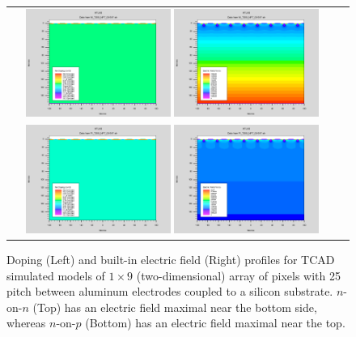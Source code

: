 \begin{figure}[htb]
  \begin{center}
    \begin{tabular}{cc}
      \includegraphics[width=0.45\textwidth]{fig_FastTiming/Net_Doping_nonn.png}
      \includegraphics[width=0.45\textwidth]{fig_FastTiming/ElectricField_nonn.png} \\
      \includegraphics[width=0.45\textwidth]{fig_FastTiming/Net_Doping_nonp.png}
      \includegraphics[width=0.45\textwidth]{fig_FastTiming/ElectricField_nonp.png} \\
    \end{tabular}
    \caption{Doping (Left) and built-in electric field (Right) profiles for TCAD simulated models of $1 \times 9$ (two-dimensional) array of pixels with 25 \si{\micron} pitch between aluminum electrodes coupled to a silicon substrate.
            $n$-on-$n$ (Top) has an electric field maximal near the bottom side, whereas $n$-on-$p$ (Bottom) has an electric field maximal near the top.
            }
    \label{Doping_ElectricField}
  \end{center}
\end{figure}


